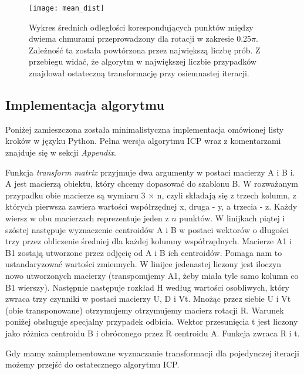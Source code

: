 \documentclass{article}
\begin{document}
\begin{figure}[h]
\centering
\texttt{[image: mean\_dist]}
\caption{Wykres średnich odległości korespondujących punktów między dwiema chmurami przeprowadzony dla rotacji w zakresie 0.25$\pi$. Zależność ta została powtórzona przez największą liczbę prób. Z przebiegu widać, że algorytm w największej liczbie przypadków znajdował ostateczną transformację przy osiemnastej iteracji.}
\end{figure}

\newpage
\subsection{\LARGE{Implementacja algorytmu}}
Poniżej zamieszczona została minimalistyczna implementacja omówionej listy kroków w języku Python. Pełna wersja algorytmu ICP wraz z komentarzami znajduje się w sekcji \emph{Appendix}.



Funkcja \emph{transform matrix} przyjmuje dwa argumenty w postaci macierzy A i B i. A jest macierzą obiektu, który chcemy dopasować do szablonu B. W rozważanym przypadku obie macierze są wymiaru 3 $\times$ n, czyli składają się z trzech kolumn, z których pierwsza zawiera wartości współrzędnej x, druga - y, a trzecia - z. Każdy wiersz w obu macierzach reprezentuje jeden z $n$ punktów. W linijkach piątej i szóstej następuje wyznaczenie centroidów A i B w postaci wektorów o długości trzy przez obliczenie średniej dla każdej kolumny współrzędnych. Macierze A1 i B1 zostają utworzone przez odjęcię od A i B ich centroidów. Pomaga nam to ustandaryzować wartości zmiennych. W linijce jedenastej liczony jest iloczyn nowo utworzonych macierzy (transponujemy A1, żeby miała tyle samo kolumn co B1 wierszy). Następnie następuje rozkład H według wartości osobliwych, który zwraca trzy czynniki w postaci macierzy U, D i Vt. Mnożąc przez siebie U i Vt (obie transponowane) otrzymujemy otrzymujemy macierz rotacji R. Warunek poniżej obsługuje specjalny przypadek odbicia. Wektor przesunięcia t jest liczony jako różnica centroidu B i obróconego przez R centroidu A. Funkcja zwraca R i t.

Gdy mamy zaimplementowane wyznaczanie transformacji dla pojedynczej iteracji możemy przejść do ostatecznego algorytmu ICP.


\end{document}
